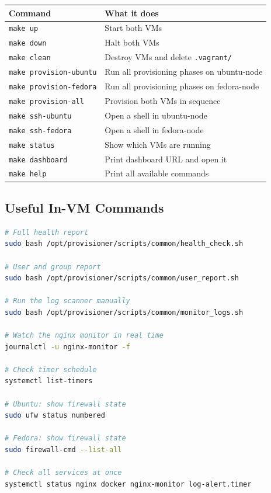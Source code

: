 \documentclass[11pt,a4paper]{article}
\begin{document}
\begin{center}
\begin{tabular}{L{5.5cm}L{8cm}}
\toprule
\textbf{Command} & \textbf{What it does} \\
\midrule
\texttt{make up}               & Start both VMs \\
\texttt{make down}             & Halt both VMs \\
\texttt{make clean}            & Destroy VMs and delete \texttt{.vagrant/} \\
\texttt{make provision-ubuntu} & Run all provisioning phases on ubuntu-node \\
\texttt{make provision-fedora} & Run all provisioning phases on fedora-node \\
\texttt{make provision-all}    & Provision both VMs in sequence \\
\texttt{make ssh-ubuntu}       & Open a shell in ubuntu-node \\
\texttt{make ssh-fedora}       & Open a shell in fedora-node \\
\texttt{make status}           & Show which VMs are running \\
\texttt{make dashboard}        & Print dashboard URL and open it \\
\texttt{make help}             & Print all available commands \\
\bottomrule
\end{tabular}
\end{center}

\subsection{Useful In-VM Commands}

\begin{lstlisting}[language=bash]
# Full health report
sudo bash /opt/provisioner/scripts/common/health_check.sh

# User and group report
sudo bash /opt/provisioner/scripts/common/user_report.sh

# Run the log scanner manually
sudo bash /opt/provisioner/scripts/common/monitor_logs.sh

# Watch the nginx monitor in real time
journalctl -u nginx-monitor -f

# Check timer schedule
systemctl list-timers

# Ubuntu: show firewall state
sudo ufw status numbered

# Fedora: show firewall state
sudo firewall-cmd --list-all

# Check all services at once
systemctl status nginx docker nginx-monitor log-alert.timer
\end{lstlisting}
\end{document}
